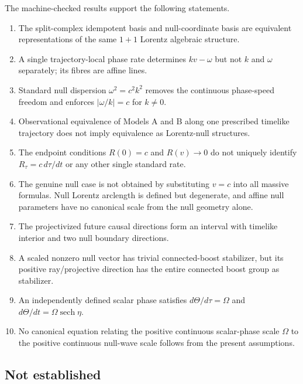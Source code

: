 \documentclass[11pt,a4paper]{article}
\newcommand{\sech}{\operatorname{sech}}
\begin{document}
The machine-checked results support the following statements.
\begin{enumerate}[label=\arabic*.]
\item The split-complex idempotent basis and null-coordinate basis are equivalent representations of the same $1+1$ Lorentz algebraic structure.
\item A single trajectory-local phase rate determines $kv-\omega$ but not $k$ and $\omega$ separately; its fibres are affine lines.
\item Standard null dispersion $\omega^2=c^2k^2$ removes the continuous phase-speed freedom and enforces $|\omega/k|=c$ for $k\neq0$.
\item Observational equivalence of Models A and B along one prescribed timelike trajectory does not imply equivalence as Lorentz-null structures.
\item The endpoint conditions $R(0)=c$ and $R(v)\to0$ do not uniquely identify $R_\tau=c\,d\tau/dt$ or any other single standard rate.
\item The genuine null case is not obtained by substituting $v=c$ into all massive formulas.  Null Lorentz arclength is defined but degenerate, and affine null parameters have no canonical scale from the null geometry alone.
\item The projectivized future causal directions form an interval with timelike interior and two null boundary directions.
\item A scaled nonzero null vector has trivial connected-boost stabilizer, but its positive ray/projective direction has the entire connected boost group as stabilizer.
\item An independently defined scalar phase satisfies $d\Theta/d\tau=\Omega$ and $d\Theta/dt=\Omega\sech\eta$.
\item No canonical equation relating the positive continuous scalar-phase scale $\Omega$ to the positive continuous null-wave scale follows from the present assumptions.
\end{enumerate}

\subsection{Not established}
\end{document}
